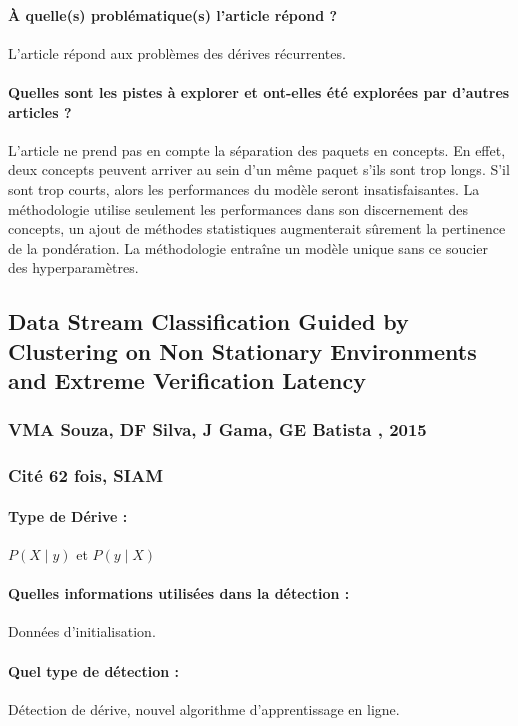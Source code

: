 \documentclass[11pt,a4paper]{report}
\begin{document}
\paragraph{À quelle(s) problématique(s) l'article répond ?} L'article répond aux problèmes des dérives récurrentes.

\paragraph{Quelles sont les pistes à explorer et ont-elles été explorées par d'autres articles ?} L'article ne prend pas en compte la séparation des paquets en concepts. En effet, deux concepts peuvent arriver au sein d'un même paquet s'ils sont trop longs. S'il sont trop courts, alors les performances du modèle seront insatisfaisantes. La méthodologie utilise seulement les performances dans son discernement des concepts, un ajout de méthodes statistiques augmenterait sûrement la pertinence de la pondération. La méthodologie entraîne un modèle unique sans ce soucier des hyperparamètres.







\subsection{Data Stream Classification Guided by Clustering on Non Stationary Environments and Extreme Verification Latency}
\subsubsection{VMA Souza, DF Silva, J Gama, GE Batista , 2015}
\subsubsection{Cité 62 fois, SIAM}

\paragraph{Type de Dérive :} $P(X\mid y)$ et $P(y \mid X)$
\paragraph{Quelles informations utilisées dans la détection :} Données d'initialisation.
\paragraph{Quel type de détection :} Détection de dérive, nouvel algorithme d'apprentissage en ligne.
\end{document}
